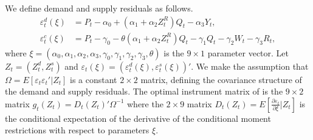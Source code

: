 \documentclass[11pt, a4paper]{article}
\begin{document}
We define demand and supply residuals as follows.
\begin{align*}
    \varepsilon^{d}_{t}(\xi) &= P_{t} - \alpha_0 + (\alpha_1 + \alpha_2Z^{R}_{t})Q_{t} - \alpha_3 Y_{t},\\
    \varepsilon^c_{t}(\xi) &= P_{t} - \gamma_0 - \theta (\alpha_1 + \alpha_2 Z^{R}_{t})Q_{t} - \gamma_1 Q_{t} - \gamma_2 W_{t} - \gamma_3 R_{t},
\end{align*}
where $\xi=\left(\alpha_0, \alpha_1, \alpha_2, \alpha_3, \gamma_0, \gamma_1, \gamma_2, \gamma_3, \theta\right)$ is the $9\times 1$ parameter vector. 
Let $Z_{t}=(Z_{t}^{d},Z_{t}^{s})$ and $\varepsilon_{t}(\xi)=(\varepsilon_{t}^{d}(\xi),\varepsilon_{t}^{s}(\xi))'$.
We make the assumption that $\Omega=E[\varepsilon_{t}\varepsilon_{t}'|Z_{t}]$ is a constant $2\times 2$ matrix, defining the covariance structure of the demand and supply residuals.
The optimal instrument matrix of \cite{chamberlain1987asymptotic} is the $9\times 2$ matrix $g_{t}(Z_{t})=D_{t}(Z_{t})'\Omega^{-1}$
where the $2\times 9$ matrix $D_{t}(Z_{t})=E\left[\frac{\partial \varepsilon_{t}}{\partial \xi}| Z_{t}\right]$ is the conditional expectation of the derivative of the conditional moment restrictions with respect to parameters $\xi$. 
\end{document}
